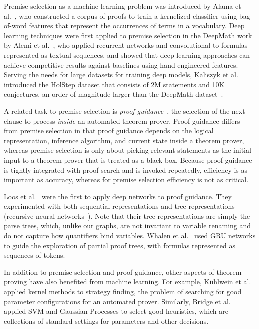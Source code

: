 \documentclass{article}
\begin{document}
Premise selection as a machine learning problem was introduced by Alama et
al.~\cite{alama2014premise}, who constructed a corpus of proofs to train a kernelized classifier
using bag-of-word features that represent the occurrences of terms in a
vocabulary.
Deep learning techniques were first applied to premise selection in the DeepMath work by Alemi et al.~\cite{deepmath},
who applied recurrent networks and convolutional to formulas represented as textual
sequences, and
showed that deep learning approaches can achieve competitive results against baselines using
hand-engineered features. Serving the needs for large datasets for training deep models,
Kaliszyk et al.~\cite{holstep} introduced the HolStep dataset that consists of 2M statements
and 10K conjectures, an order of magnitude larger than the DeepMath dataset~\cite{deepmath}. 

A related task to premise selection is \emph{proof
 guidance}~\cite{suttner1990automatic, denzinger1999learning, schulz2000learning, farber2016internal, kaliszyk2015femalecop, whalen2016holophrasm}, the selection of the next clause to process \emph{inside} an automated theorem
prover. Proof guidance differs from premise selection in that proof guidance 
 depends on the logical representation, inference algorithm, and current state inside a theorem
prover, whereas premise selection is only about picking relevant statements as the initial
input to a theorem prover that is treated as a black box. Because proof guidance is
tightly integrated with proof search and is invoked repeatedly, efficiency is as important
as accuracy, whereas for premise selection efficiency is not as critical. 

Loos et al.~\cite{deep_guide_proof} were the first to apply deep networks to proof
guidance. They experimented with both
sequential representations and tree representations (recursive neural networks~\cite{SocherEtAl2011:PoolRAE,
  socher2011parsing}). Note that their tree representations are simply the parse trees,
which, unlike our graphs, are not invariant to variable renaming and do not capture how
quantifiers bind variables. Whalen et al.~\cite{whalen2016holophrasm} used GRU networks to guide the exploration of partial proof trees, with formulas represented as sequences of tokens.

In addition to premise selection and proof guidance, other aspects of theorem proving have
also benefited from machine learning. For example, K\"uhlwein et
al.~\cite{kuhlwein2015males} applied kernel methods to strategy
finding, the problem of searching for good parameter configurations for an automated
prover. Similarly, Bridge et al.~\cite{Bridge2014} applied SVM and Gaussian Processes to select good heuristics, which are collections of standard settings for parameters and other decisions.
\end{document}
